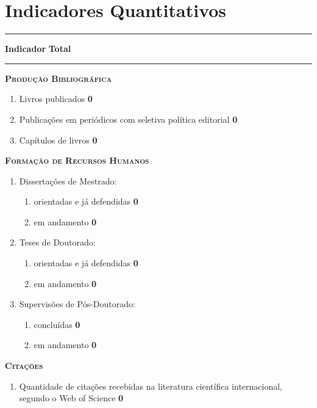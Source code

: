 \section{Indicadores Quantitativos}
\newcommand{\indrow}[2]{\item #1 \hfill \textbf{#2}}
\noindent\rule{\textwidth}{1.25pt}\par	%
\vspace{0em}
\noindent\textbf{Indicador} \hfill \textbf{Total}\par
\vspace{-0.4em}
\noindent\rule{\textwidth}{0.75pt}\par	%
\vspace{0.7em}

\noindent\textbf{\textsc{Produção Bibliográfica}}
\begin{enumerate}[label=\arabic*), leftmargin=2em]
    \indrow{Livros publicados}{0}
    \indrow{Publicações em periódicos com seletiva política editorial}{0}
    \indrow{Capítulos de livros}{0}
\end{enumerate}

\vspace{1em}
\noindent\textbf{\textsc{Formação de Recursos Humanos}}
\begin{enumerate}[resume, label=\arabic*), leftmargin=2em]
    \item Dissertações de Mestrado:
    \begin{enumerate}[label=\arabic{enumi}.\alph*), leftmargin=1.5em]
        \indrow{orientadas e já defendidas}{0}
        \indrow{em andamento}{0}
    \end{enumerate}
    \item Teses de Doutorado:
    \begin{enumerate}[label=\arabic{enumi}.\alph*), leftmargin=1.5em]
        \indrow{orientadas e já defendidas}{0}
        \indrow{em andamento}{0}
    \end{enumerate}
    \item Supervisões de Pós-Doutorado:
    \begin{enumerate}[label=\arabic{enumi}.\alph*), leftmargin=1.5em]
        \indrow{concluídas}{0}
        \indrow{em andamento}{0}
    \end{enumerate}
\end{enumerate}

\vspace{1em}
\noindent\textbf{\textsc{Citações}}
\begin{enumerate}[resume, label=\arabic*), leftmargin=2em]
    \indrow{Quantidade de citações recebidas na literatura científica internacional, segundo o Web of Science}{0}
\end{enumerate}


